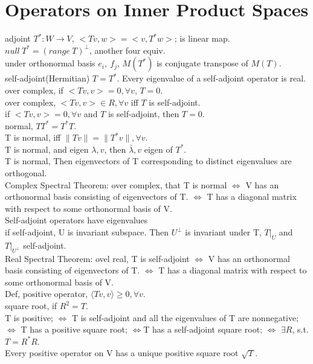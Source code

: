 \documentclass[paper=a4, fontsize=11pt]{scrartcl} %
\numberwithin{equation}{section} %
\numberwithin{figure}{section} %
\numberwithin{table}{section} %
\begin{document}
\section{Operators on Inner Product Spaces}
adjoint $T^*:W\rightarrow V$, $<Tv,w> = <v,T^*w>$; is linear map. $null\ T^* = (range\ T)^\bot$, another four equiv.\\
under orthonormal basis $e_i,\ f_j$, $M(T^*)$ is conjugate transpose of $M(T)$.\\
self-adjoint(Hermitian) $T=T^*$. Every eigenvalue of a self-adjoint operator is real.\\
over complex, if $<Tv,v>=0, \forall v$, $T=0$.\\
over complex, $<Tv,v>\in R,\forall v$ iff $T$ is self-adjoint.\\
if $<Tv,v>=0,\forall v$ and $T$ is self-adjoint, then $T=0$.\\
normal, $TT^*=T^*T$.\\
T is normal, iff $\|Tv\|=\|T^*v\|,\forall v$.\\
T is normal, and eigen $\lambda,v$, then $\bar{\lambda},v$ eigen of $T^*$.\\
T is normal, Then eigenvectors of T corresponding to distinct eigenvalues are orthogonal.\\
Complex Spectral Theorem: over complex, that T is normal $\Leftrightarrow$ V has an orthonormal basis consisting of eigenvectors of T. $\Leftrightarrow$ T has a diagonal matrix with respect to some orthonormal basis of V.\\
Self-adjoint operators have eigenvalues\\
if self-adjoint, U is invariant subspace. Then $U^\bot$ is invariant under T, $T|_U$ and $T|_{U^\bot}$ self-adjoint.\\
Real Spectral Theorem:  ovel real, T is self-adjoint $\Leftrightarrow$ V has an orthonormal basis consisting of eigenvectors of T. $\Leftrightarrow$ T has a diagonal matrix with respect to some orthonormal basis of V.\\
Def, positive operator, $\langle Tv,v\rangle \geq 0,\forall v$.\\
square root, if $R^2=T$.\\
T is positive; $\Leftrightarrow$ T is self-adjoint and all the eigenvalues of T are nonnegative; $\Leftrightarrow$ T has a positive square root; $\Leftrightarrow$T has a self-adjoint square root; $\Leftrightarrow$ $\exists R$, s.t. $T=R^*R$.\\
Every positive operator on V has a unique positive square root $\sqrt{T}$.\\
\end{document}
